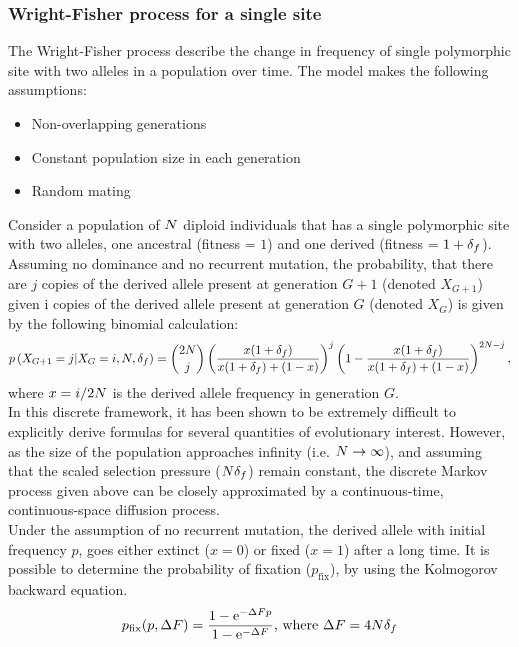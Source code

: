 \subsubsection{Wright-Fisher process for a single site}
The Wright-Fisher process describe the change in frequency of single polymorphic site with two alleles in a population over time.
The model makes the following assumptions:
\begin{itemize}
	\setlength\itemsep{-0.2em}
	\item Non-overlapping generations
	\item Constant population size in each generation
	\item Random mating
\end{itemize}
Consider a population of $N$ diploid individuals that has a single polymorphic site with two alleles, one ancestral (fitness = $1$) and one derived (fitness = $1+{\delta_{f}}$).
Assuming no dominance and no recurrent mutation, the probability, that there are $j$ copies of the derived allele present at generation $G+1$ (denoted $X_{G+1}$) given i copies of the derived allele present at generation $G$ (denoted $X_{G}$) is given by the following binomial calculation:
\begin{equation}
p\left( X_{G+1} = j |X_{G} = i, N, {\delta_{f}} \right)  =  \binom{2 N}{j} \left( \dfrac{x(1+{\delta_{f}})}{x(1+{\delta_{f}}) + (1-x)} \right)^j \left(1 - \dfrac{x(1+{\delta_{f}})}{x(1+{\delta_{f}}) + (1-x)} \right)^{2 N -j}, 
\end{equation}
where $x = i / 2 N$ is the derived allele frequency in generation $G$.\\
In this discrete framework, it has been shown to be extremely difficult to explicitly derive formulas for several quantities of evolutionary interest.
However, as the size of the population approaches infinity (i.e.
$ N \rightarrow \infty$), and assuming that the scaled selection pressure ($N {\delta_{f}} $) remain constant, the discrete Markov process given above can be closely approximated by a continuous-time, continuous-space diffusion process.\\
Under the assumption of no recurrent mutation, the derived allele with initial frequency $p$, goes either extinct ($x=0$) or fixed ($x=1$) after a long time.
It is possible to determine the probability of fixation ($p_{\mathrm{fix}}$), by using the Kolmogorov backward equation.
\begin{equation}
p_{\mathrm{fix}}(p, {\Delta F} ) = \dfrac{1 - \mathrm{e}^{-{\Delta F} p }}{1 - \mathrm{e}^{-{\Delta F}}}\text{, where } {\Delta F}=4N {\delta_{f}} 
\end{equation}
